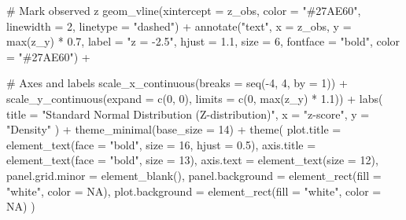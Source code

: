 \documentclass[
  letterpaper,
  DIV=11,
  numbers=noendperiod]{scrreprt}
\newenvironment{Shaded}{\begin{snugshade}}{\end{snugshade}}
\newcommand{\AttributeTok}[1]{\textcolor[rgb]{0.40,0.45,0.13}{#1}}
\newcommand{\CommentTok}[1]{\textcolor[rgb]{0.37,0.37,0.37}{#1}}
\newcommand{\ConstantTok}[1]{\textcolor[rgb]{0.56,0.35,0.01}{#1}}
\newcommand{\DecValTok}[1]{\textcolor[rgb]{0.68,0.00,0.00}{#1}}
\newcommand{\FloatTok}[1]{\textcolor[rgb]{0.68,0.00,0.00}{#1}}
\newcommand{\FunctionTok}[1]{\textcolor[rgb]{0.28,0.35,0.67}{#1}}
\newcommand{\NormalTok}[1]{\textcolor[rgb]{0.00,0.23,0.31}{#1}}
\newcommand{\SpecialCharTok}[1]{\textcolor[rgb]{0.37,0.37,0.37}{#1}}
\newcommand{\StringTok}[1]{\textcolor[rgb]{0.13,0.47,0.30}{#1}}
\begin{document}
\begin{Shaded}
\begin{Highlighting}[]
  \CommentTok{\# Mark observed z}
  \FunctionTok{geom\_vline}\NormalTok{(}\AttributeTok{xintercept =}\NormalTok{ z\_obs, }\AttributeTok{color =} \StringTok{"\#27AE60"}\NormalTok{, }
             \AttributeTok{linewidth =} \DecValTok{2}\NormalTok{, }\AttributeTok{linetype =} \StringTok{"dashed"}\NormalTok{) }\SpecialCharTok{+}
  \FunctionTok{annotate}\NormalTok{(}\StringTok{"text"}\NormalTok{, }\AttributeTok{x =}\NormalTok{ z\_obs, }\AttributeTok{y =} \FunctionTok{max}\NormalTok{(z\_y) }\SpecialCharTok{*} \FloatTok{0.7}\NormalTok{, }
           \AttributeTok{label =} \StringTok{"z = {-}2.5"}\NormalTok{,}
           \AttributeTok{hjust =} \FloatTok{1.1}\NormalTok{, }\AttributeTok{size =} \DecValTok{6}\NormalTok{, }\AttributeTok{fontface =} \StringTok{"bold"}\NormalTok{, }\AttributeTok{color =} \StringTok{"\#27AE60"}\NormalTok{) }\SpecialCharTok{+}
  
  \CommentTok{\# Axes and labels}
  \FunctionTok{scale\_x\_continuous}\NormalTok{(}\AttributeTok{breaks =} \FunctionTok{seq}\NormalTok{(}\SpecialCharTok{{-}}\DecValTok{4}\NormalTok{, }\DecValTok{4}\NormalTok{, }\AttributeTok{by =} \DecValTok{1}\NormalTok{)) }\SpecialCharTok{+}
  \FunctionTok{scale\_y\_continuous}\NormalTok{(}\AttributeTok{expand =} \FunctionTok{c}\NormalTok{(}\DecValTok{0}\NormalTok{, }\DecValTok{0}\NormalTok{), }\AttributeTok{limits =} \FunctionTok{c}\NormalTok{(}\DecValTok{0}\NormalTok{, }\FunctionTok{max}\NormalTok{(z\_y) }\SpecialCharTok{*} \FloatTok{1.1}\NormalTok{)) }\SpecialCharTok{+}
  \FunctionTok{labs}\NormalTok{(}
    \AttributeTok{title =} \StringTok{"Standard Normal Distribution (Z{-}distribution)"}\NormalTok{,}
    \AttributeTok{x =} \StringTok{"z{-}score"}\NormalTok{,}
    \AttributeTok{y =} \StringTok{"Density"}
\NormalTok{  ) }\SpecialCharTok{+}
  \FunctionTok{theme\_minimal}\NormalTok{(}\AttributeTok{base\_size =} \DecValTok{14}\NormalTok{) }\SpecialCharTok{+}
  \FunctionTok{theme}\NormalTok{(}
    \AttributeTok{plot.title =} \FunctionTok{element\_text}\NormalTok{(}\AttributeTok{face =} \StringTok{"bold"}\NormalTok{, }\AttributeTok{size =} \DecValTok{16}\NormalTok{, }\AttributeTok{hjust =} \FloatTok{0.5}\NormalTok{),}
    \AttributeTok{axis.title =} \FunctionTok{element\_text}\NormalTok{(}\AttributeTok{face =} \StringTok{"bold"}\NormalTok{, }\AttributeTok{size =} \DecValTok{13}\NormalTok{),}
    \AttributeTok{axis.text =} \FunctionTok{element\_text}\NormalTok{(}\AttributeTok{size =} \DecValTok{12}\NormalTok{),}
    \AttributeTok{panel.grid.minor =} \FunctionTok{element\_blank}\NormalTok{(),}
    \AttributeTok{panel.background =} \FunctionTok{element\_rect}\NormalTok{(}\AttributeTok{fill =} \StringTok{"white"}\NormalTok{, }\AttributeTok{color =} \ConstantTok{NA}\NormalTok{),}
    \AttributeTok{plot.background =} \FunctionTok{element\_rect}\NormalTok{(}\AttributeTok{fill =} \StringTok{"white"}\NormalTok{, }\AttributeTok{color =} \ConstantTok{NA}\NormalTok{)}
\NormalTok{  )}
\end{Highlighting}
\end{Shaded}
\end{document}
